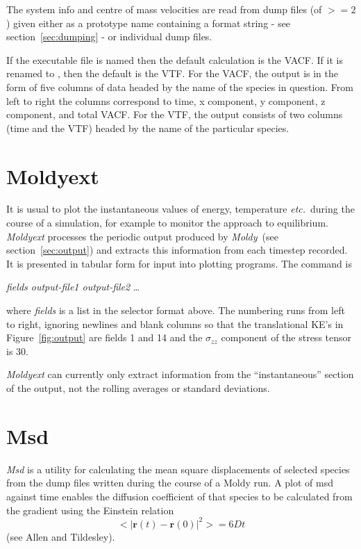 \documentclass[a4paper,twoside]{report}
\providecommand{\bm}[1]{\mathbf{#1}}
\newcommand{\moldy}{\emph{Moldy}}
\newcommand{\etc}{\emph{etc.}}
\begin{document}
The system info and centre of mass velocities are read from dump files (of 
$>= 2$) given either as a prototype name containing a  format
string - see section~\ref{sec:dumping} - or individual dump files.

If the executable file is named  then the default calculation
is the VACF. If it is renamed to , then the default is the
VTF. For the VACF, the output is in the form of five columns
of data headed by the name of the species in question. From left to right the columns correspond to
time, x component, y component, z component, and total VACF. For the VTF, the output consists of
two columns (time and the VTF) headed by the name of the particular species.

\section{Moldyext}%
It is usual to plot the instantaneous values of energy, temperature
\etc\ during the course of a simulation, for example to monitor the
approach to equilibrium.  \emph{Moldyext} processes the periodic
output produced by \moldy\ (see section~\ref{sec:output}) and extracts
this information from each timestep recorded.  It is presented in
tabular form for input into plotting programs.  The command is
\begin{center}
 \textit{fields output-file1 output-file2} \ldots
\end{center}
where \emph{fields} is a list in the selector format above.  The
numbering runs from left to right, ignoring newlines and blank columns
so that the translational KE's in Figure~\ref{fig:output} are fields 1
and 14 and the $\sigma_{zz}$ component of the stress tensor is 30.

\emph{Moldyext} can currently only extract information from the
``instantaneous'' section of the output, not the rolling averages or
standard deviations.

\section{Msd}%
\emph{Msd} is a utility for calculating the mean square displacements
of selected species from the dump files written during the course of a
Moldy run. A plot of msd against time enables the diffusion
coefficient of that species to be calculated from the gradient using
the Einstein relation
\begin{equation}
   <|\bm{r}(t)-\bm{r}(0)|^2> = 6 D t
\end{equation}
(see Allen and Tildesley\cite[p60]{allen:87}).
\end{document}

